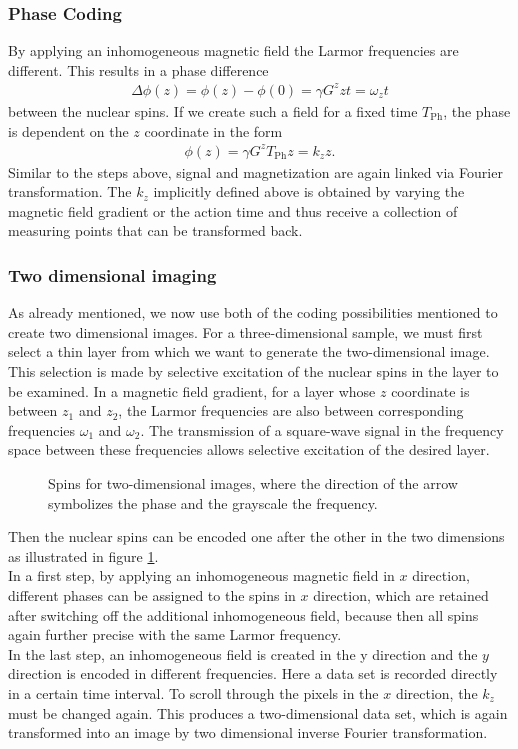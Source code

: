 \subsubsection{Phase Coding}
By applying an inhomogeneous magnetic field the Larmor frequencies are different.
This results in a phase difference
\begin{align}
\Delta \phi(z)=\phi(z)-\phi(0)=\gamma G^z zt=\omega_z t
\end{align}
between the nuclear spins.
If we create such a field for a fixed time $T_\text{Ph}$, the phase is dependent on the $z$ coordinate in the form
\begin{align}
\phi(z)=\gamma G^z T_\text{Ph} z=k_z z.
\end{align}
Similar to the steps above, signal and magnetization are again linked via Fourier transformation.
The $k_z$ implicitly defined above is obtained by varying the magnetic field gradient or the action time and thus receive a collection of measuring points that can be transformed back.

\subsubsection{Two dimensional imaging}
As already mentioned, we now use both of the coding possibilities mentioned to create two dimensional images.
For a three-dimensional sample, we must first select a thin layer from which we want to generate the two-dimensional image.
This selection is made by selective excitation of the nuclear spins in the layer to be examined.
In a magnetic field gradient, for a layer whose $z$ coordinate is between $z_1$ and $z_2$, the Larmor frequencies are also between corresponding frequencies $\omega_1$ and $\omega_2$.
The transmission of a square-wave signal in the frequency space between these frequencies allows selective excitation of the desired layer.
\begin{figure}[ht]
\centering

\caption{Spins for two-dimensional images, where the direction of the arrow symbolizes the phase and the grayscale the frequency.}
\label{fig:phase}
\end{figure}
Then the nuclear spins can be encoded one after the other in the two dimensions as illustrated in figure \ref{fig:phase}.\\

In a first step, by applying an inhomogeneous magnetic field in $x$ direction, different phases can be assigned to the spins in $x$ direction, which are retained after switching off the additional inhomogeneous field, because then all spins again further precise with the same Larmor frequency.\\
In the last step, an inhomogeneous field is created in the y direction and the $y$ direction is encoded in different frequencies.
Here a data set is recorded directly in a certain time interval.
To scroll through the pixels in the $x$ direction, the $k_z$ must be changed again.
This produces a two-dimensional data set, which is again transformed into an image by two dimensional inverse Fourier transformation.\\

